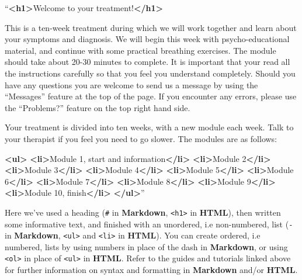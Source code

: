 \documentclass[]{book}
\newenvironment{Shaded}{\begin{snugshade}}{\end{snugshade}}
\newcommand{\KeywordTok}[1]{\textcolor[rgb]{0.13,0.29,0.53}{\textbf{#1}}}
\newcommand{\NormalTok}[1]{#1}
\begin{document}
\begin{Shaded}
\begin{Highlighting}[]
\NormalTok{“}\KeywordTok{<h1>}\NormalTok{Welcome to your treatment!}\KeywordTok{</h1>}

\NormalTok{This is a ten-week treatment during which we will work together and learn about your symptoms and diagnosis. We will begin this week with psycho-educational material, and continue with some practical breathing exercises. The module should take about 20-30 minutes to complete. It is important that your read all the instructions carefully so that you feel you understand completely. Should you have any questions you are welcome to send us a message by using the “Messages” feature at the top of the page.}
\NormalTok{If you encounter any errors, please use the “Problems?” feature on the top right hand side.}

\NormalTok{Your treatment is divided into ten weeks, with a new module each week. Talk to your therapist if you feel you need to go slower. The modules are as follows:}

\KeywordTok{<ul>}
  \KeywordTok{<li>}\NormalTok{Module 1, start and information}\KeywordTok{</li>}
  \KeywordTok{<li>}\NormalTok{Module 2}\KeywordTok{</li>}
  \KeywordTok{<li>}\NormalTok{Module 3}\KeywordTok{</li>}
  \KeywordTok{<li>}\NormalTok{Module 4}\KeywordTok{</li>}
  \KeywordTok{<li>}\NormalTok{Module 5}\KeywordTok{</li>}
  \KeywordTok{<li>}\NormalTok{Module 6}\KeywordTok{</li>}
  \KeywordTok{<li>}\NormalTok{Module 7}\KeywordTok{</li>}
  \KeywordTok{<li>}\NormalTok{Module 8}\KeywordTok{</li>}
  \KeywordTok{<li>}\NormalTok{Module 9}\KeywordTok{</li>}
  \KeywordTok{<li>}\NormalTok{Module 10, finish}\KeywordTok{</li>}
\KeywordTok{</ul>}\NormalTok{”}
\end{Highlighting}
\end{Shaded}

Here we've used a heading (\texttt{\#} in \textbf{Markdown}, \texttt{\textless{}h1\textgreater{}} in \textbf{HTML}), then written some informative text, and finished with an unordered, i.e non-numbered, list (\texttt{-} in \textbf{Markdown}, \texttt{\textless{}ul\textgreater{}} and \texttt{\textless{}li\textgreater{}} in \textbf{HTML}). You can create ordered, i.e numbered, lists by using numbers in place of the dash in \textbf{Markdown}, or using \texttt{\textless{}ol\textgreater{}} in place of \texttt{\textless{}ul\textgreater{}} in \textbf{HTML}. Refer to the guides and tutorials linked above for further information on syntax and formatting in \textbf{Markdown} and/or \textbf{HTML}.
\end{document}
